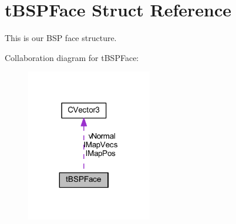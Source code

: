 \hypertarget{structt_b_s_p_face}{}\section{t\+B\+S\+P\+Face Struct Reference}
\label{structt_b_s_p_face}


This is our B\+SP face structure.  




Collaboration diagram for t\+B\+S\+P\+Face\+:
\nopagebreak
\begin{figure}[H]
\begin{center}
\leavevmode
\includegraphics[width=155pt]{structt_b_s_p_face__coll__graph}
\end{center}
\end{figure}
